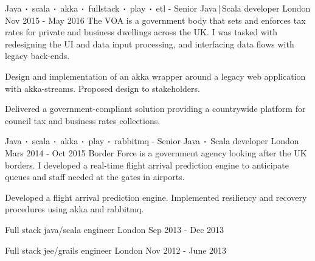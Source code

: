 \begin{cventries}
    \cventry
    {Java$\sqbig$scala$\sqbig$akka$\sqbig$fullstack$\sqbig$play$\sqbig$etl}
    { - Senior Java\,|\,Scala developer}
    {London}
    {Nov 2015 - May 2016}
    {The VOA is a government body that sets and enforces tax rates for private and business dwellings across the UK. I was tasked with redesigning the UI and data input processing, and interfacing data flows with legacy back-ends. }
    {
        \begin{cvitems}
            \item{Design and implementation of an akka wrapper around a legacy web application with akka-streams. Proposed design to stakeholders.}
            \item{Delivered a government-compliant solution providing a countrywide platform for council tax and business rates collections.}
        \end{cvitems}
    }

    \cventry
    {Java$\sqbig$scala$\sqbig$akka$\sqbig$play$\sqbig$rabbitmq}
    { - Senior Java$\sqbig$Scala developer}
    {London}
    {Mars 2014 - Oct 2015}
    {Border Force is a government agency looking after the UK borders. I developed a real-time flight arrival prediction engine to anticipate queues and staff needed at the gates in airports.}
    {
        \begin{cvitems}
            \item{Developed a flight arrival prediction engine. Implemented resiliency and recovery procedures using akka and rabbitmq.}
        \end{cvitems}
    }

    \cventry
    {Full stack java/scala engineer}
    {} 
    {London}
    {Sep 2013 - Dec 2013}
    {}
    {}

    \cventry
    {Full stack jee/grails engineer}
    {} 
    {London}
    {Nov 2012 - June 2013}
    {}
    {}


\end{cventries}
